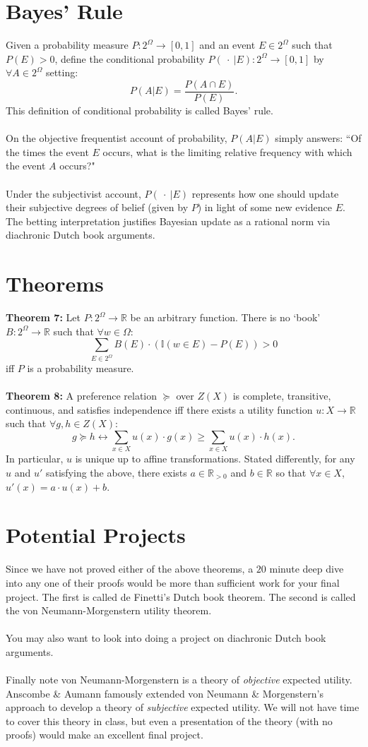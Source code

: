 \documentclass[11pt]{article}
\theoremstyle{definition}
\theoremstyle{plain}
\begin{document}
\section{Bayes' Rule}
Given a probability measure $P:2^{\Omega} \to [0,1]$ and an event $E \in 2^{\Omega}$ such that $P(E)>0$, define the conditional probability $P(\ \cdot \ |  E):2^{\Omega} \to [0,1]$ by $\forall A \in 2^{\Omega}$ setting:
$$P(A|E)=\frac{P(A \cap E)}{P(E)}.$$
This definition of conditional probability is called Bayes' rule.
\\
\\
On the objective frequentist account of probability, $P(A|E)$ simply answers: ``Of the times the event $E$ occurs, what is the limiting relative frequency with which the event $A$ occurs?"
\\
\\
Under the subjectivist account, $P( \ \cdot \ | E)$ represents how one should update their subjective degrees of belief (given by $P$) in light of some new evidence $E$. The betting interpretation justifies Bayesian update as a rational norm via diachronic Dutch book arguments.

\section{Theorems}
\textbf{Theorem 7:} Let $P: 2^{\Omega} \to \mathbb{R}$ be an arbitrary function. There is no `book' $B: 2^{\Omega} \to \mathbb{R}$ such that $\forall w \in \Omega$:
$$\sum_{E \in 2^{\Omega}} B(E) \cdot (\mathbb{I}(w\in E)-P(E))>0$$ 
iff $P$ is a probability measure.
\\
\\
\textbf{Theorem 8:} A preference relation $\succeq$ over $Z(X)$ is complete, transitive, continuous, and satisfies independence iff there exists a utility function $u:X \to \mathbb{R}$ such that $\forall g,h \in Z(X)$:
$$g \succeq h \leftrightarrow \sum_{x\in X}u(x) \cdot g(x) \geq \sum_{x\in X}u(x) \cdot h(x).$$
In particular, $u$ is unique up to affine transformations. Stated differently, for any $u$ and $u'$ satisfying the above, there exists $a\in \mathbb{R}_{>0}$ and $b \in \mathbb{R}$ so that $\forall x \in X$, $u'(x)=a \cdot u(x)+b$.
\section{Potential Projects}
Since we have not proved either of the above theorems, a $20$ minute deep dive into any one of their proofs would be more than sufficient work for your final project. The first  is called de Finetti's Dutch book theorem. The second  is called the von Neumann-Morgenstern utility theorem. 
\\
\\
You may also want to look into doing a project on diachronic Dutch book arguments.
\\
\\
Finally note von Neumann-Morgenstern is a theory of \emph{objective} expected utility. Anscombe \& Aumann famously extended von Neumann \& Morgenstern's approach to develop a theory of \emph{subjective} expected utility. We will not have time to cover this theory in class, but even a presentation of the theory (with no proofs) would make an excellent final project.
\end{document}
